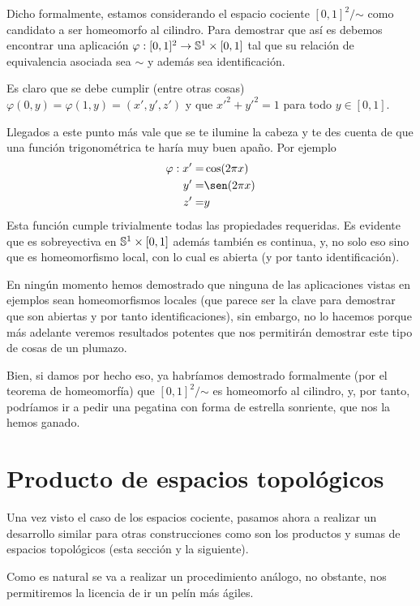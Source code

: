 \begin{exa}[Cilindro]
	Dicho formalmente, estamos considerando el espacio cociente $[0,1]^2/\mathord{\sim}$ como candidato a ser homeomorfo al cilindro. Para demostrar que así es debemos encontrar una aplicación $\varphi:[0,1]^2\to\mathbb{S}^1\times[0,1]$ tal que su relación de equivalencia asociada sea $\sim$ y además sea identificación.
	
	Es claro que se debe cumplir (entre otras cosas) $\varphi(0,y)=\varphi(1,y)=(x',y',z')$ y que $x'^2+y'^2=1$ para todo $y\in[0,1]$.
	
	Llegados a este punto más vale que se te ilumine la cabeza y te des cuenta de que una función trigonométrica te haría muy buen apaño. Por ejemplo
	\[\begin{split}
		\varphi: x'= & \cos(2\pi x)\\
		y' =& \sen(2\pi x)\\
		z' =& y
	\end{split}\]
	Esta función cumple trivialmente todas las propiedades requeridas. Es evidente que es sobreyectiva en $\mathbb{S}^1\times [0,1]$ además también es continua, y, no solo eso sino que es homeomorfismo local, con lo cual es abierta (y por tanto identificación).
	
	En ningún momento hemos demostrado que ninguna de las aplicaciones vistas en ejemplos sean homeomorfismos locales (que parece ser la clave para demostrar que son abiertas y por tanto identificaciones), sin embargo, no lo hacemos porque más adelante veremos resultados potentes que nos permitirán demostrar este tipo de cosas de un plumazo.
	
	Bien, si damos por hecho eso, ya habríamos demostrado formalmente (por el teorema de homeomorfía) que $[0,1]^2/\mathord{\sim}$ es homeomorfo al cilindro, y, por tanto, podríamos ir a pedir una pegatina con forma de estrella sonriente, que nos la hemos ganado. 
\end{exa}
\section{Producto de espacios topológicos}
Una vez visto el caso de los espacios cociente, pasamos ahora a realizar un desarrollo similar para otras construcciones como son los productos y sumas de espacios topológicos (esta sección y la siguiente).

Como es natural se va a realizar un procedimiento análogo, no obstante, nos permitiremos la licencia de ir un pelín más ágiles.
